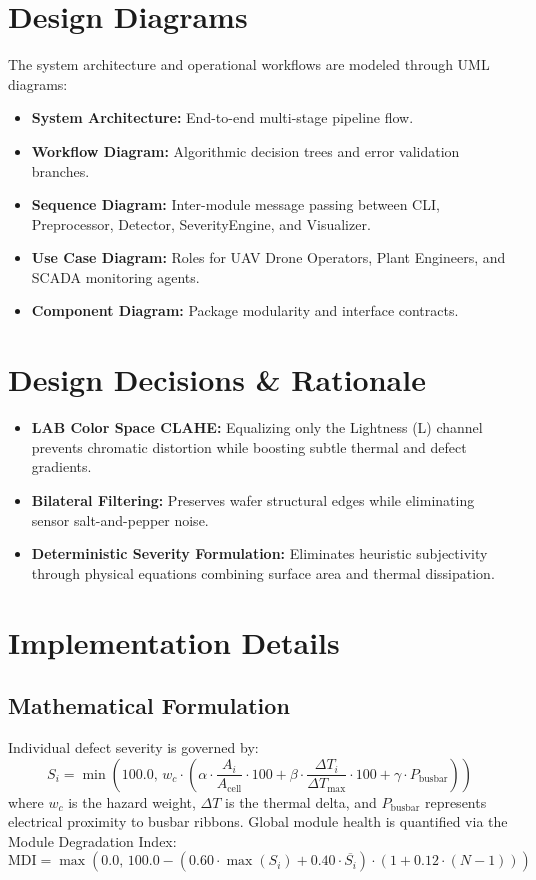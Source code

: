 \documentclass[11pt,a4paper]{article}
\begin{document}
\section{Design Diagrams}
The system architecture and operational workflows are modeled through UML diagrams:
\begin{itemize}
    \item \textbf{System Architecture:} End-to-end multi-stage pipeline flow.
    \item \textbf{Workflow Diagram:} Algorithmic decision trees and error validation branches.
    \item \textbf{Sequence Diagram:} Inter-module message passing between CLI, Preprocessor, Detector, SeverityEngine, and Visualizer.
    \item \textbf{Use Case Diagram:} Roles for UAV Drone Operators, Plant Engineers, and SCADA monitoring agents.
    \item \textbf{Component Diagram:} Package modularity and interface contracts.
\end{itemize}

\section{Design Decisions \& Rationale}
\begin{itemize}
    \item \textbf{LAB Color Space CLAHE:} Equalizing only the Lightness (L) channel prevents chromatic distortion while boosting subtle thermal and defect gradients.
    \item \textbf{Bilateral Filtering:} Preserves wafer structural edges while eliminating sensor salt-and-pepper noise.
    \item \textbf{Deterministic Severity Formulation:} Eliminates heuristic subjectivity through physical equations combining surface area and thermal dissipation.
\end{itemize}

\section{Implementation Details}
\subsection{Mathematical Formulation}
Individual defect severity is governed by:
\begin{equation}
S_i = \min\left(100.0, \, w_c \cdot \left(\alpha \cdot \frac{A_i}{A_{\text{cell}}} \cdot 100 + \beta \cdot \frac{\Delta T_i}{\Delta T_{\max}} \cdot 100 + \gamma \cdot P_{\text{busbar}}\right)\right)
\end{equation}
where $w_c$ is the hazard weight, $\Delta T$ is the thermal delta, and $P_{\text{busbar}}$ represents electrical proximity to busbar ribbons.
Global module health is quantified via the Module Degradation Index:
\begin{equation}
\text{MDI} = \max\left(0.0, \, 100.0 - (0.60 \cdot \max(S_i) + 0.40 \cdot \overline{S_i}) \cdot (1 + 0.12 \cdot (N - 1))\right)
\end{equation}
\end{document}
